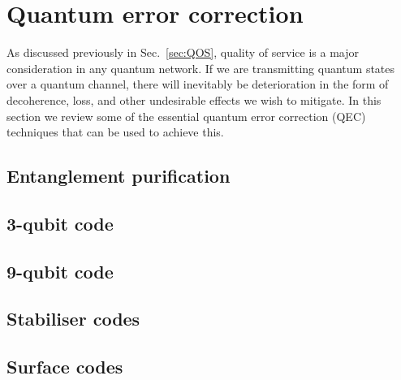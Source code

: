 %
%

\section{Quantum error correction}


As discussed previously in Sec.~\ref{sec:QOS}, quality of service is a major consideration in any quantum network. If we are transmitting quantum states over a quantum channel, there will inevitably be deterioration in the form of decoherence, loss, and other undesirable effects we wish to mitigate. In this section we review some of the essential quantum error correction (QEC) techniques that can be used to achieve this.

%
%

\subsection{Entanglement purification}


%
%

\subsection{3-qubit code}


%
%

\subsection{9-qubit code}


%
%

\subsection{Stabiliser codes}


%
%

\subsection{Surface codes}

